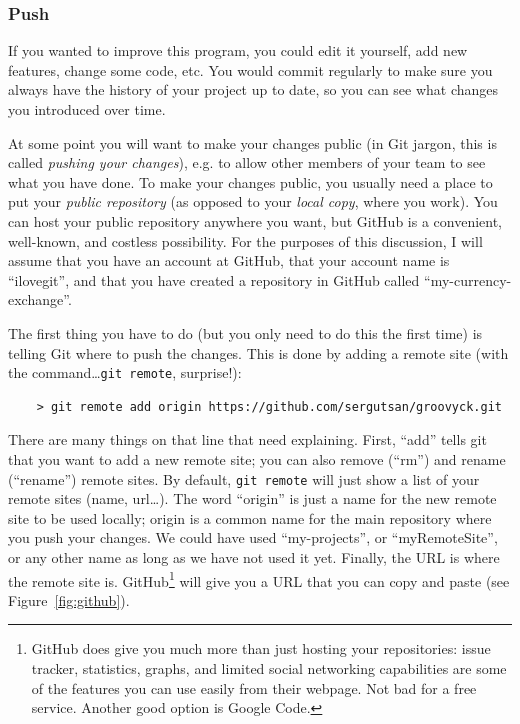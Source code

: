 \subsubsection{Push}
\label{sec:push}

If you wanted to improve this program, you could edit it yourself, add
new features, change some code, etc. You would commit regularly to
make sure you always have the history of your project up to date, so
you can see what changes you introduced over time. 

At some point you will want to make your changes public (in Git
jargon, this is called \emph{pushing your changes}), e.g. to allow
other members of your team to see what you have done. To make your
changes public, you usually need a place to put your \emph{public
repository} (as opposed to your \emph{local copy}, where you
work). You can host your public repository anywhere you want, but
GitHub is a convenient, well-known, and costless possibility. For the
purposes of this discussion, I will assume that you have an account at
GitHub, that your account name is ``ilovegit'', and that you have
created a repository in GitHub called ``my-currency-exchange''. 

The first thing you have to do (but you only need to do this the first
time) is telling Git where to push the changes. This is done by adding
a remote site (with the command\ldots \verb+git remote+, surprise!):

\begin{verbatim}
    > git remote add origin https://github.com/sergutsan/groovyck.git
\end{verbatim}

There are many things on that line that need explaining. First,
``add'' tells git that you want to add a new remote site; you can also
remove (``rm'') and rename (``rename'') remote sites. By default,
\verb+git remote+ will just show a list of your remote sites (name,
url\ldots). The word ``origin'' is just a name for the new remote site
to be used locally; origin is a common name for the main repository
where you push your changes. We could have used ``my-projects'', or
``myRemoteSite'', or any other name as long as we have not used it
yet. Finally, the URL is where the remote site
is. GitHub\footnote{GitHub does give you much more than just hosting
  your repositories: issue tracker, statistics, graphs, and limited
  social networking capabilities are some of the features you can use
  easily from their webpage. Not bad for a free service. Another good
  option is Google Code.} will give
you a URL that you can copy and paste (see Figure~\ref{fig:github}).

